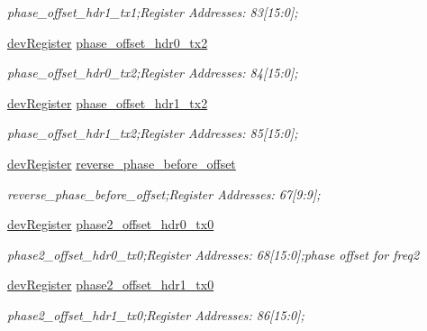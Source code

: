 \begin{DoxyCompactItemize}
\begin{DoxyCompactList}\small\item\em phase\+\_\+offset\+\_\+hdr1\+\_\+tx1;Register Addresses\+: 83\mbox{[}15\+:0\mbox{]}; \end{DoxyCompactList}\item 
\mbox{\hyperlink{classdev_register}{dev\+Register}} \mbox{\hyperlink{class_o_p_t3101_registers_aca4709b359b3002aa5b1fda1db2a6b2c}{phase\+\_\+offset\+\_\+hdr0\+\_\+tx2}}
\begin{DoxyCompactList}\small\item\em phase\+\_\+offset\+\_\+hdr0\+\_\+tx2;Register Addresses\+: 84\mbox{[}15\+:0\mbox{]}; \end{DoxyCompactList}\item 
\mbox{\hyperlink{classdev_register}{dev\+Register}} \mbox{\hyperlink{class_o_p_t3101_registers_aaed020c2f63021ddd838bc354a7aaf5a}{phase\+\_\+offset\+\_\+hdr1\+\_\+tx2}}
\begin{DoxyCompactList}\small\item\em phase\+\_\+offset\+\_\+hdr1\+\_\+tx2;Register Addresses\+: 85\mbox{[}15\+:0\mbox{]}; \end{DoxyCompactList}\item 
\mbox{\hyperlink{classdev_register}{dev\+Register}} \mbox{\hyperlink{class_o_p_t3101_registers_afa400ade995f6cfe1f7c076216f2a724}{reverse\+\_\+phase\+\_\+before\+\_\+offset}}
\begin{DoxyCompactList}\small\item\em reverse\+\_\+phase\+\_\+before\+\_\+offset;Register Addresses\+: 67\mbox{[}9\+:9\mbox{]}; \end{DoxyCompactList}\item 
\mbox{\hyperlink{classdev_register}{dev\+Register}} \mbox{\hyperlink{class_o_p_t3101_registers_a2d47813676979e52ff81ccb79f403568}{phase2\+\_\+offset\+\_\+hdr0\+\_\+tx0}}
\begin{DoxyCompactList}\small\item\em phase2\+\_\+offset\+\_\+hdr0\+\_\+tx0;Register Addresses\+: 68\mbox{[}15\+:0\mbox{]};phase offset for freq2 \end{DoxyCompactList}\item 
\mbox{\hyperlink{classdev_register}{dev\+Register}} \mbox{\hyperlink{class_o_p_t3101_registers_abc2e13726f35094652e115b306a6c8cf}{phase2\+\_\+offset\+\_\+hdr1\+\_\+tx0}}
\begin{DoxyCompactList}\small\item\em phase2\+\_\+offset\+\_\+hdr1\+\_\+tx0;Register Addresses\+: 86\mbox{[}15\+:0\mbox{]}; \end{DoxyCompactList}\item 

\end{DoxyCompactItemize}
